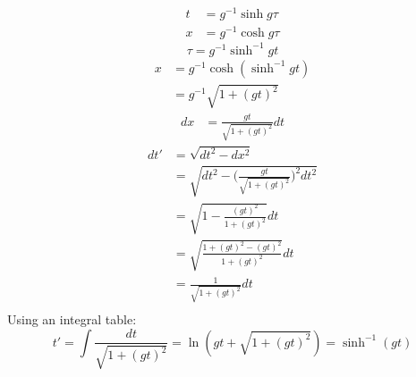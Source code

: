 \documentclass[9pt]{report}
\begin{document}
\begin{enumerate}
\[
  \begin{align}
    t &= g^{-1} \sinh g \tau \\
    x &= g^{-1} \cosh g \tau
  \end{align}
\]
\[
  \tau = g^{-1}\sinh^{-1} gt
\]
\[
  \begin{align}
    x &= g^{-1} \cosh(\sinh^{-1} gt) \\
      &= g^{-1} \sqrt{1 + (gt)^2}
  \end{align}
\]
\[
  \begin{align}
    dx &= \frac{gt}{\sqrt{1 + (gt)^2}} dt
  \end{align}
\]
\[
  \begin{align}
    dt' &= \sqrt{dt^2 - dx^2} \\
        &= \sqrt{dt^2 - \Big(\frac{gt}{\sqrt{1 + (gt)^2} }\Big)^2dt^2}\\
        &= \sqrt{1 - \frac{(gt)^2}{1 + (gt)^2}}dt\\
        &= \sqrt{\frac{1 + (gt)^2 - (gt)^2}{1 + (gt)^2 }}dt\\
        &= \frac{1}{\sqrt{1 + (gt)^2 }}dt\\
  \end{align}
\]
Using an integral table:
\[
  t' = \int \frac{dt}{\sqrt{1+(gt)^2} } = \ln (gt + \sqrt{1+(gt)^2}) = \sinh^{-1}(gt)
\]
\end{enumerate}
\end{document}
